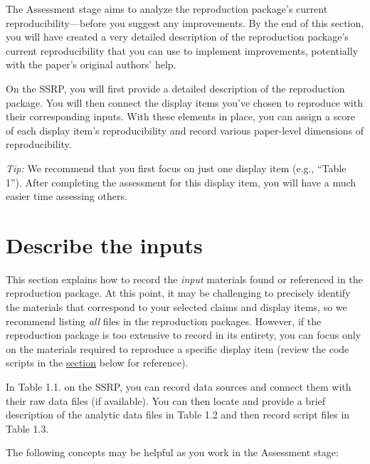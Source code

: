\documentclass[
]{book}
\begin{document}
The Assessment stage aims to analyze the reproduction package's current reproducibility---before you suggest any improvements. By the end of this section, you will have created a very detailed description of the reproduction package's current reproducibility that you can use to implement improvements, potentially with the paper's original authors' help.

On the SSRP, you will first provide a detailed description of the reproduction package. You will then connect the display items you've chosen to reproduce with their corresponding inputs. With these elements in place, you can assign a score of each display item's reproducibility and record various paper-level dimensions of reproducibility.

\emph{Tip:} We recommend that you first focus on just one display item (e.g., ``Table 1''). After completing the assessment for this display item, you will have a much easier time assessing others.

\hypertarget{describe-inputs}{%
\section{Describe the inputs}\label{describe-inputs}}

This section explains how to record the \emph{input} materials found or referenced in the reproduction package. At this point, it may be challenging to precisely identify the materials that correspond to your selected claims and display items, so we recommend listing \emph{all} files in the reproduction packages. However, if the reproduction package is too extensive to record in its entirety, you can focus only on the materials required to reproduce a specific display item (review the code scripts in the \protect\hyperlink{desc-analy}{section} below for reference).

In Table 1.1. on the SSRP, you can record data sources and connect them with their raw data files (if available). You can then locate and provide a brief description of the analytic data files in Table 1.2 and then record script files in Table 1.3.

The following concepts may be helpful as you work in the Assessment stage:
\end{document}
